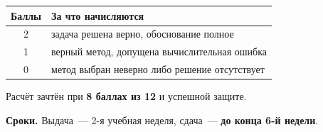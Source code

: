 \documentclass[12pt, a4paper]{article}
\begin{document}
\begin{center}
\begin{tabular}{|c|l|}
  \hline
  Баллы & За что начисляются \\
  \hline
  2 & задача решена верно, обоснование полное \\
  1 & верный метод, допущена вычислительная ошибка \\
  0 & метод выбран неверно либо решение отсутствует \\
  \hline
\end{tabular}
\end{center}

\vspace{0.5em}
\noindent
Расчёт зачтён при \textbf{8 баллах из 12} и успешной защите.

\vspace{0.7em}
\noindent\textbf{Сроки.} Выдача~--- 2-я учебная неделя,
сдача~--- \textbf{до конца 6-й недели}.
\end{document}
